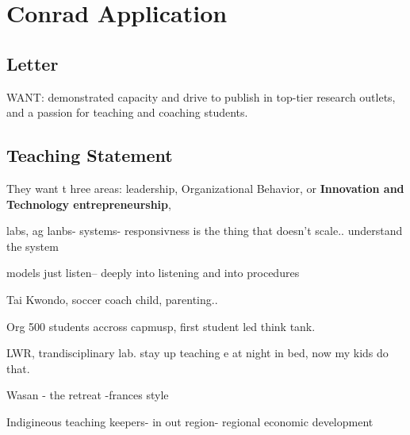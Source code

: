 \chapter{Conrad Application}

\begin{comment}

TODO 
 January 12, 2023. 
 - Email your curriculum vitae, 
 - cover letter (including details of relevant work experience outside the academy, if applicable), 
 - teaching statement, and 
 - research statement

- LinkedIn
- ReseachGate/ORCID
-

- copy xx's lab

JOB DESCRIPTION
https://uwaterloo.ca/engineering/associate-or-full-professor-organizational-behaviour?utm_source=dept&utm_medium=dept&utm_id=dept

PhD Fellowship
https://uwaterloo.ca/conrad-school-entrepreneurship-business/news/meet-7-recipients-first-entrepreneurial-phd-fellowship

\end{comment}

\section{Letter}

WANT: 
demonstrated  capacity and drive to publish in top-tier research outlets, and a passion for teaching and coaching students.

\section{Teaching Statement}
They want t hree areas: leadership, Organizational Behavior, or \textbf{Innovation and Technology entrepreneurship},

labs, ag lanbs- systems- 
responsivness is the thing that doesn't scale.. understand the system

models
just listen-- deeply into listening and into procedures

Tai Kwondo, soccer coach child, parenting.. 

Org 500 students accross capmusp, first student led think tank.

LWR, trandisciplinary lab.
stay up teaching e at night in bed, now my kids do that.

Wasan - the retreat -frances style

Indigineous teaching keepers- in out region- regional economic development

